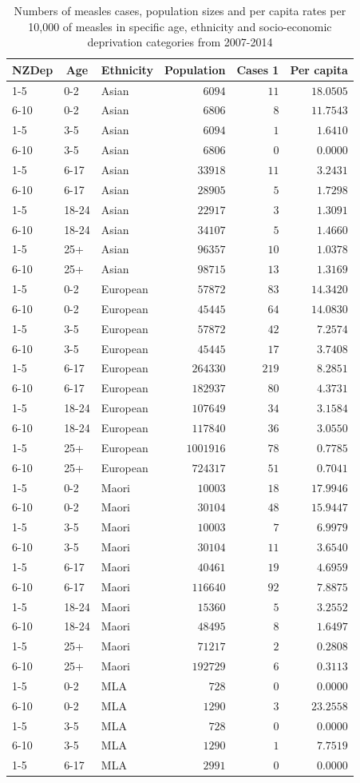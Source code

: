 \documentclass{article}
\begin{document}
\begin{table}[hbtp]
\footnotesize
\caption{Numbers of measles cases, population sizes and per capita rates per 10,000 of measles in specific age, ethnicity and socio-economic deprivation categories from 2007-2014}
\begin{center}
\begin{tabular}{lllrrr}
\hline\hline
\multicolumn{1}{c}{NZDep}&\multicolumn{1}{c}{Age}&\multicolumn{1}{c}{Ethnicity}&\multicolumn{1}{c}{Population}&\multicolumn{1}{c}{Cases 1}&\multicolumn{1}{c}{Per capita}\tabularnewline
\hline
1-5&0-2&Asian&$   6094$&$ 11$&$18.0505$\tabularnewline
6-10&0-2&Asian&$   6806$&$  8$&$11.7543$\tabularnewline
1-5&3-5&Asian&$   6094$&$  1$&$ 1.6410$\tabularnewline
6-10&3-5&Asian&$   6806$&$  0$&$ 0.0000$\tabularnewline
1-5&6-17&Asian&$  33918$&$ 11$&$ 3.2431$\tabularnewline
6-10&6-17&Asian&$  28905$&$  5$&$ 1.7298$\tabularnewline
1-5&18-24&Asian&$  22917$&$  3$&$ 1.3091$\tabularnewline
6-10&18-24&Asian&$  34107$&$  5$&$ 1.4660$\tabularnewline
1-5&25+&Asian&$  96357$&$ 10$&$ 1.0378$\tabularnewline
6-10&25+&Asian&$  98715$&$ 13$&$ 1.3169$\tabularnewline
1-5&0-2&European&$  57872$&$ 83$&$14.3420$\tabularnewline
6-10&0-2&European&$  45445$&$ 64$&$14.0830$\tabularnewline
1-5&3-5&European&$  57872$&$ 42$&$ 7.2574$\tabularnewline
6-10&3-5&European&$  45445$&$ 17$&$ 3.7408$\tabularnewline
1-5&6-17&European&$ 264330$&$219$&$ 8.2851$\tabularnewline
6-10&6-17&European&$ 182937$&$ 80$&$ 4.3731$\tabularnewline
1-5&18-24&European&$ 107649$&$ 34$&$ 3.1584$\tabularnewline
6-10&18-24&European&$ 117840$&$ 36$&$ 3.0550$\tabularnewline
1-5&25+&European&$1001916$&$ 78$&$ 0.7785$\tabularnewline
6-10&25+&European&$ 724317$&$ 51$&$ 0.7041$\tabularnewline
1-5&0-2&Maori&$  10003$&$ 18$&$17.9946$\tabularnewline
6-10&0-2&Maori&$  30104$&$ 48$&$15.9447$\tabularnewline
1-5&3-5&Maori&$  10003$&$  7$&$ 6.9979$\tabularnewline
6-10&3-5&Maori&$  30104$&$ 11$&$ 3.6540$\tabularnewline
1-5&6-17&Maori&$  40461$&$ 19$&$ 4.6959$\tabularnewline
6-10&6-17&Maori&$ 116640$&$ 92$&$ 7.8875$\tabularnewline
1-5&18-24&Maori&$  15360$&$  5$&$ 3.2552$\tabularnewline
6-10&18-24&Maori&$  48495$&$  8$&$ 1.6497$\tabularnewline
1-5&25+&Maori&$  71217$&$  2$&$ 0.2808$\tabularnewline
6-10&25+&Maori&$ 192729$&$  6$&$ 0.3113$\tabularnewline
1-5&0-2&MLA&$    728$&$  0$&$ 0.0000$\tabularnewline
6-10&0-2&MLA&$   1290$&$  3$&$23.2558$\tabularnewline
1-5&3-5&MLA&$    728$&$  0$&$ 0.0000$\tabularnewline
6-10&3-5&MLA&$   1290$&$  1$&$ 7.7519$\tabularnewline
1-5&6-17&MLA&$   2991$&$  0$&$ 0.0000$\tabularnewline

\end{tabular}
\end{center}
\end{table}
\end{document}
